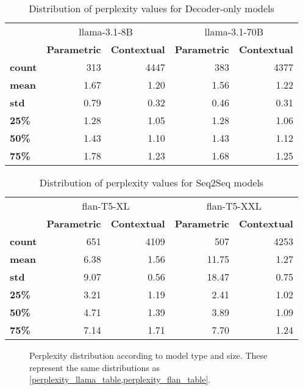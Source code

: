 \begin{table}[ht]
	\centering
	\footnotesize
	\begin{tabular}{>{\bfseries}l | r r | r r}
		\toprule
			& \multicolumn{2}{|c}{\ttfamily llama-3.1-8B} & \multicolumn{2}{|c}{\ttfamily llama-3.1-70B} \\
			& \bfseries Parametric & \bfseries Contextual & \bfseries Parametric & \bfseries Contextual \\
		\midrule
			count &  313 & 4447 &  383 & 4377  \\
			mean  & 1.67 & 1.20 & 1.56 & 1.22  \\
			std   & 0.79 & 0.32 & 0.46 & 0.31  \\
			25\%  & 1.28 & 1.05 & 1.28 & 1.06  \\
			50\%  & 1.43 & 1.10 & 1.43 & 1.12  \\
			75\%  & 1.78 & 1.23 & 1.68 & 1.25  \\
		\bottomrule
	\end{tabular}
	\caption{Distribution of perplexity values for Decoder-only models}
	\label{perplexity_llama_table}
\end{table}

\begin{table}[ht]
	\centering
	\footnotesize
	\begin{tabular}{>{\bfseries}l | r r | r r}
		\toprule
			& \multicolumn{2}{|c}{\ttfamily flan-T5-XL} & \multicolumn{2}{|c}{\ttfamily flan-T5-XXL} \\
			& \bfseries Parametric & \bfseries Contextual & \bfseries Parametric & \bfseries Contextual \\
		\midrule
			count &  651 & 4109 &   507 & 4253 \\
			mean  & 6.38 & 1.56 & 11.75 & 1.27 \\
			std   & 9.07 & 0.56 & 18.47 & 0.75 \\
			25\%  & 3.21 & 1.19 &  2.41 & 1.02 \\
			50\%  & 4.71 & 1.39 &  3.89 & 1.09 \\
			75\%  & 7.14 & 1.71 &  7.70 & 1.24 \\
		\bottomrule
	\end{tabular}
	\caption{Distribution of perplexity values for Seq2Seq models}
	\label{perplexity_flan_table}
\end{table}

\begin{figure}[H]
	\centering
	\caption{Perplexity distribution according to model type and size. These represent the same distributions as \cref{perplexity_llama_table,perplexity_flan_table}.}
	\label{perplexity_results}
\end{figure}

